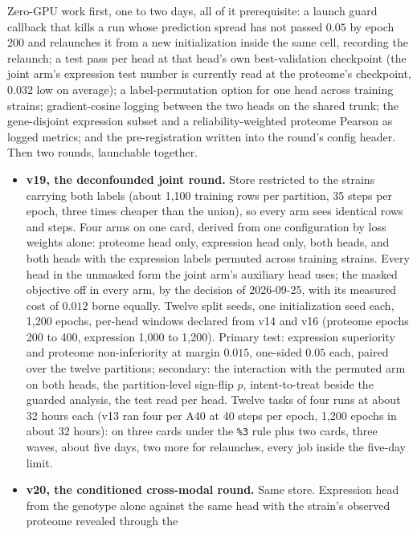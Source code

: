  Zero-GPU work first, one to two days, all of it prerequisite: a launch
guard callback that kills a run whose prediction spread has not passed $0.05$ by epoch 200 and
relaunches it from a new initialization inside the same cell, recording the relaunch; a test
pass per head at that head's own best-validation checkpoint (the joint arm's expression test
number is currently read at the proteome's checkpoint, $0.032$ low on average); a
label-permutation option for one head across training strains; gradient-cosine logging between
the two heads on the shared trunk; the gene-disjoint expression subset and a
reliability-weighted proteome Pearson as logged metrics; and the pre-registration written into
the round's config header. Then two rounds, launchable together.

\begin{itemize}
\item \textbf{v19, the deconfounded joint round.} Store  restricted to the
  strains carrying both labels (about 1,100 training rows per partition, 35 steps per epoch,
  three times cheaper than the union), so every arm sees identical rows and steps. Four arms on
  one card, derived from one configuration by loss weights alone: proteome head only,
  expression head only, both heads, and both heads with the expression labels permuted across
  training strains. Every head in the unmasked form the joint arm's auxiliary head uses; the
  masked objective off in every arm, by the decision of 2026-09-25, with its measured cost of
  $0.012$ borne equally. Twelve split seeds, one initialization seed each, 1,200 epochs,
  per-head windows declared from v14 and v16 (proteome epochs 200 to 400, expression 1,000 to
  1,200). Primary test: expression superiority and proteome non-inferiority at margin $0.015$,
  one-sided $0.05$ each, paired over the twelve partitions; secondary: the interaction with the
  permuted arm on both heads, the partition-level sign-flip $p$, intent-to-treat beside the
  guarded analysis, the test read per head. Twelve tasks of four runs at about 32 hours each
  (v13 ran four per A40 at 40 steps per epoch, 1,200 epochs in about 32 hours): on three
   cards under the \texttt{\%3} rule plus two  cards, three waves, about
  five days, two more for relaunches, every job inside the five-day limit.
\item \textbf{v20, the conditioned cross-modal round.} Same store. Expression head from the
  genotype alone against the same head with the strain's observed proteome revealed through the

\end{itemize}

